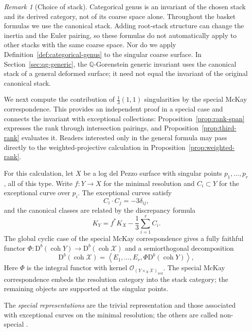\documentclass[11pt]{article}
\theoremstyle{plain}
\theoremstyle{definition}
\theoremstyle{remark}
\newtheorem{remark}[theorem]{Remark}
\newcommand{\cX}{\mathcal X}
\newcommand{\Db}{\mathrm D^b}
\newcommand{\coh}{\operatorname{coh}}
\newcommand{\Q}{\mathbb Q}
\newcommand{\1}{\mathbf 1}
\begin{document}
\begin{remark}[Choice of stack]\label{rem:choice-of-stack}
Categorical genus is an invariant of the chosen stack and its derived category, not of its coarse space alone.  Throughout the basket formulas we use the canonical stack.  Adding root-stack structure can change the inertia and the Euler pairing, so these formulas do not automatically apply to other stacks with the same coarse space.  Nor do we apply Definition~\ref{def:categorical-genus} to the singular coarse surface.  In Section~\ref{sec:qg-generic}, the $\Q$-Gorenstein generic invariant uses the canonical stack of a general deformed surface; it need not equal the invariant of the original canonical stack.
\end{remark}

We next compute the contribution of $\frac13(1,1)$ singularities by the special McKay correspondence.  This provides an independent proof in a special case and connects the invariant with exceptional collections: Proposition~\ref{prop:rank-span} expresses the rank through intersection pairings, and Proposition~\ref{prop:third-rank} evaluates it.  Readers interested only in the general formula may pass directly to the weighted-projective calculation in Proposition~\ref{prop:weighted-rank}.

For this calculation, let $X$ be a log del Pezzo surface with singular points $p_1,\dots,p_r$, all of this type.  Write $f:Y\to X$ for the minimal resolution and $C_i\subset Y$ for the exceptional curve over $p_i$.  The exceptional curves satisfy
\[
C_i\cdot C_j=-3\delta_{ij},
\]
and the canonical classes are related by the discrepancy formula
\begin{equation}\label{eq:discrepancy}
K_Y=f^*K_X-\frac13\sum_{i=1}^r C_i.
\end{equation}
The global cyclic case of the special McKay correspondence \cite[Proposition 8.1]{IU} gives a fully faithful functor $\Phi:\Db(\coh Y)\to\Db(\coh\cX)$ and a semiorthogonal decomposition
\begin{equation}\label{eq:IU-sod}
\Db(\coh\cX)
=\left\langle E_1,\dots,E_r,\Phi\Db(\coh Y)\right\rangle,
\end{equation}
Here $\Phi$ is the integral functor with kernel $\mathcal O_{(Y\times_X\cX)_{\mathrm{red}}}$.  The special McKay correspondence embeds the resolution category into the stack category; the remaining objects are supported at the singular points.

The \emph{special representations} are the trivial representation and those associated with exceptional curves on the minimal resolution; the others are called non-special \cite[Section 2.3]{GR}.
\end{document}
